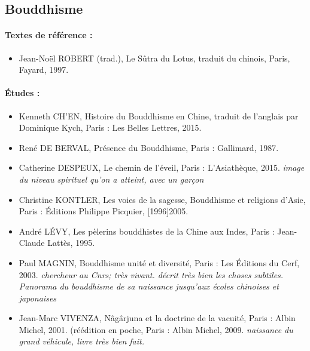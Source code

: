  


\subsection{Bouddhisme}
\paragraph{Textes de référence :}

\begin{itemize}
    \item Jean-Noël ROBERT (trad.), Le Sûtra du Lotus, traduit du chinois, Paris, Fayard, 1997.
 

\end{itemize}

\paragraph{Études :}

\begin{itemize}
 
    \item Kenneth CH’EN, Histoire du Bouddhisme en Chine, traduit de l’anglais par Dominique Kych, Paris : Les Belles Lettres, 2015.
    \item René DE BERVAL, Présence du Bouddhisme, Paris : Gallimard, 1987.
    \item Catherine DESPEUX, Le chemin de l’éveil, Paris : L’Asiathèque, 2015. \textit{image du niveau spirituel qu'on a atteint, avec un garçon}
    \item Christine KONTLER, Les voies de la sagesse, Bouddhisme et religions d’Asie, Paris : Éditions Philippe Picquier, [1996]2005.
    \item André LÉVY, Les pèlerins bouddhistes de la Chine aux Indes, Paris : Jean-Claude Lattès, 1995.
    \item Paul MAGNIN, Bouddhisme unité et diversité, Paris : Les Éditions du Cerf, 2003. \textit{chercheur au Cnrs; très vivant. décrit très bien les choses subtiles. Panorama du bouddhisme de sa naissance jusqu'aux écoles chinoises et japonaises}
    \item Jean-Marc VIVENZA, Nâgârjuna et la doctrine de la vacuité, Paris : Albin Michel, 2001. (réédition en poche, Paris : Albin Michel, 2009. \textit{naissance du grand véhicule, livre très bien fait.}
 

\end{itemize}



